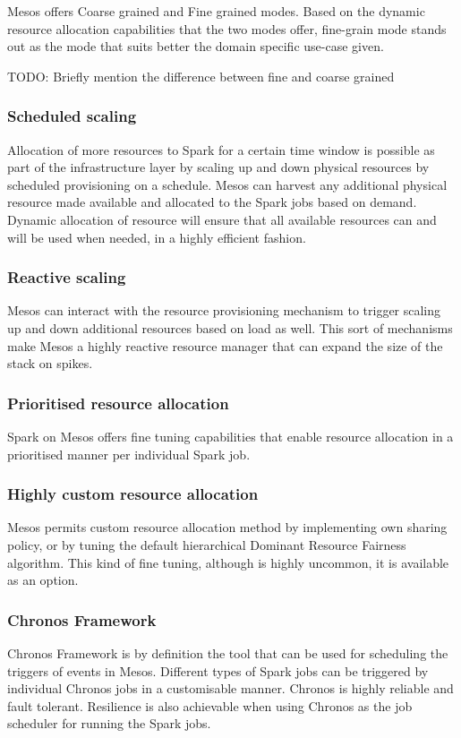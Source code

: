 \documentclass[a4paper, 10 pt, conference]{IEEEtran}
\begin{document}
Mesos offers Coarse grained and Fine grained modes. Based on the dynamic resource allocation capabilities that the two modes offer, fine-grain mode stands out as the mode that suits better the domain specific use-case given.

TODO: Briefly mention the difference between fine and coarse grained

\subsubsection{Scheduled scaling}
Allocation of more resources to Spark for a certain time window is possible as part of the infrastructure layer by scaling up and down physical resources by scheduled provisioning on a schedule. Mesos can harvest any additional physical resource made available and allocated to the Spark jobs based on demand. Dynamic allocation of resource will ensure that all available resources can and will be used when needed, in a highly efficient fashion.

\subsubsection{Reactive scaling}
Mesos can interact with the resource provisioning mechanism to trigger scaling up and down additional resources based on load as well. This sort of mechanisms make Mesos a highly reactive resource manager that can expand the size of the stack on spikes.

\subsubsection{Prioritised resource allocation}
Spark on Mesos offers fine tuning capabilities that enable resource allocation in a prioritised manner per individual Spark job.

\subsubsection{Highly custom resource allocation}
Mesos permits custom resource allocation method by implementing own sharing policy, or by tuning the default hierarchical Dominant Resource Fairness algorithm. This kind of fine tuning, although is highly uncommon, it is available as an option.

\subsubsection{Chronos Framework}
Chronos Framework is by definition the tool that can be used for scheduling the triggers of events in Mesos. Different types of Spark jobs can be triggered by individual Chronos jobs in a customisable manner. Chronos is highly reliable and fault tolerant. Resilience is also achievable when using Chronos as the job scheduler for running the Spark jobs.
\end{document}
